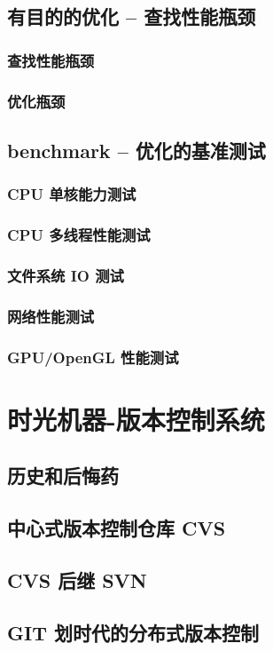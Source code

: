 \documentclass[amstex,twoside]{ctexbook}
\begin{document}
\section{  有目的的优化 – 查找性能瓶颈}
\subsection{ 查找性能瓶颈}
\subsection{  优化瓶颈}
\section{  benchmark – 优化的基准测试}
\subsection{  CPU 单核能力测试}
\subsection{  CPU 多线程性能测试}
\subsection{  文件系统 IO 测试}
\subsection{  网络性能测试}
\subsection{  GPU/OpenGL 性能测试}


\chapter{时光机器-版本控制系统}
\section{   历史和后悔药	}
\section{   中心式版本控制仓库 CVS	}
\section{   CVS 后继 SVN	}
\section{   GIT 划时代的分布式版本控制	}
\end{document}
